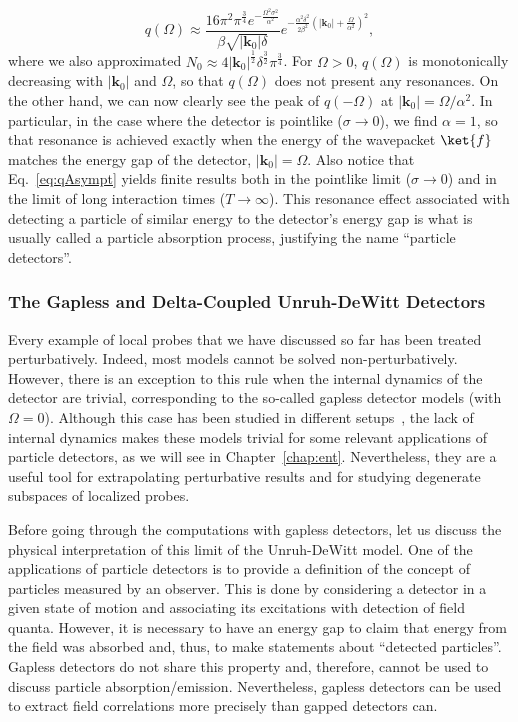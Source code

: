 \documentclass[letterpaper,12pt,titlepage,oneside,final]{book}
\begin{document}
\begin{equation}\label{eq:qAsympt}
     q(\Omega) \approx \frac{16\pi^2\pi^\frac{3}{4} e^{-\frac{\Omega^2\sigma^2}{\alpha^2}}}{\beta\sqrt{|\bm k_0|\delta}} e^{- \frac{\alpha^2\delta^2}{2 \beta^2}\left(|\bm k_0| + \frac{\Omega}{\alpha^2}\right)^2},
\end{equation}
where we also approximated $N_0 \approx 4 |\bm k_0|^\frac{1}{2}\delta^\frac{3}{2}\pi^\frac{3}{4}$. For $\Omega>0$, $q(\Omega)$ is monotonically decreasing with $|\bm k_0|$ and $\Omega$, so that $q(\Omega)$ does not present any resonances. On the other hand, we can now clearly see the peak of $q(-\Omega)$ at $|\bm k_0| = \Omega/\alpha^2$. In particular, in the case where the detector is pointlike ($\sigma \to 0$), we find $\alpha = 1$, so that resonance is achieved exactly when the energy of the wavepacket $\ket{f}$ matches the energy gap of the detector, $|\bm k_0| = \Omega$. Also notice that Eq.~\eqref{eq:qAsympt} yields finite results both in the pointlike limit ($\sigma\to 0$) and in the limit of long interaction times ($T\to \infty$). This resonance effect associated with detecting a particle of similar energy to the detector's energy gap is what is usually called a particle absorption process, justifying the name ``particle detectors''.



\subsubsection{The Gapless and Delta-Coupled Unruh-DeWitt Detectors}

Every example of local probes that we have discussed so far has been treated perturbatively. Indeed, most models cannot be solved non-perturbatively. However, there is an exception to this rule when the internal dynamics of the detector are trivial, corresponding to the so-called gapless detector models (with $\Omega = 0$). Although this case has been studied in different setups~\cite{Landulfo,nogo}, the lack of internal dynamics makes these models trivial for some relevant applications of particle detectors, as we will see in Chapter~\ref{chap:ent}. Nevertheless, they are a useful tool for extrapolating perturbative results and for studying degenerate subspaces of localized probes.

Before going through the computations with gapless detectors, let us discuss the physical interpretation of this limit of the Unruh-DeWitt model. One of the applications of particle detectors is to provide a definition of the concept of particles measured by an observer. This is done by considering a detector in a given state of motion and associating its excitations with detection of field quanta. However, it is necessary to have an energy gap to claim that energy from the field was absorbed and, thus, to make statements about ``detected particles''. Gapless detectors do not share this property and, therefore, cannot be used to discuss particle absorption/emission. Nevertheless, gapless detectors can be used to extract field correlations more precisely than gapped detectors can.
\end{document}
